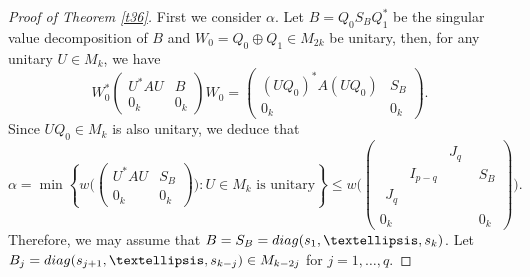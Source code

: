 \documentclass[10pt,a4paper]{amsart}
\def\diag{{\rm diag}}
\begin{document}
\begin{proof}[Proof of Theorem \ref{t36}]
 First we consider $\alpha$.
Let $B=Q_0S_BQ_1^*$ be the singular value decomposition of $B$ and $W_0=Q_0\oplus Q_1\in M_{2k}$ be unitary, then, for any unitary $U\in M_k$, we have
$$W_0^*\begin{pmatrix} U^*AU & B\\ 0_k & 0_k\end{pmatrix}W_0=\begin{pmatrix} (UQ_0)^*A(UQ_0) & S_B\\ 0_k & 0_k\end{pmatrix}.$$
Since $UQ_0\in M_k$ is also unitary, we deduce that
\begin{equation}\label{eq3}
\alpha=\min\left\{w\Big(\begin{pmatrix} U^*AU & S_B\\ 0_k & 0_k\end{pmatrix}\Big) : U\in M_k \mbox{ is unitary}\right\}\le
w\Big(\left(\begin{array}{c|c}\begin{array}{ccc}  & & J_q\\ & I_{p-q} & \\ J_q & & \end{array} & S_B
\\ \hline 0_k & 0_k\end{array}\right)\Big).
\end{equation}
Therefore, we may assume that $B=S_B=\diag(s_1, \dots, s_k)$. Let $B_j=\diag(s_{j+1}, \dots, s_{k-j})\in M_{k-2j}$ for $j=1, \dots, q$.


\end{proof}
\end{document}
